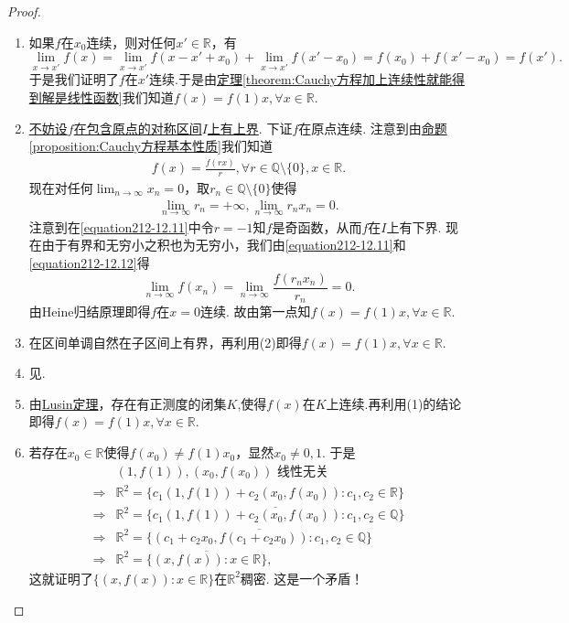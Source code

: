\documentclass[../../main.tex]{subfiles}%
\begin{document}
\begin{proof}
\begin{enumerate}[(1)]
\item 如果\(f\)在\(x_0\)连续，则对任何\(x'\in\mathbb{R}\)，有
\[
\lim_{x\rightarrow x'} f(x)=\lim_{x\rightarrow x'} f(x - x'+x_0)+\lim_{x\rightarrow x'} f(x' - x_0)=f(x_0)+f(x' - x_0)=f(x').
\]
于是我们证明了\(f\)在\(x'\)连续.于是由\hyperref[theorem:Cauchy方程加上连续性就能得到解是线性函数]{定理\ref{theorem:Cauchy方程加上连续性就能得到解是线性函数}}我们知道\(f(x)=f(1)x,\forall x\in\mathbb{R}\).

\item \hyperlink{不妨设的原因112}{不妨设\(f\)在包含原点的对称区间\(I\)上有上界}. 下证\(f\)在原点连续. 注意到由\hyperref[proposition:Cauchy方程基本性质]{命题\ref{proposition:Cauchy方程基本性质}}我们知道
\begin{align}
f(x)=\frac{f(rx)}{r},\forall r\in\mathbb{Q}\setminus\{0\},x\in\mathbb{R}.\label{equation212-12.11}
\end{align}
现在对任何\(\lim_{n\rightarrow\infty}x_n = 0\)，取\(r_n\in\mathbb{Q}\setminus\{0\}\)使得
\begin{align}
\lim_{n\rightarrow\infty}r_n=+\infty,\lim_{n\rightarrow\infty}r_nx_n = 0.\label{equation212-12.12} 
\end{align}
注意到在\eqref{equation212-12.11}中令\(r = -1\)知\(f\)是奇函数，从而\(f\)在\(I\)上有下界. 现在由于有界和无穷小之积也为无穷小，我们由\eqref{equation212-12.11}和\eqref{equation212-12.12}得
\[
\lim_{n\rightarrow\infty} f(x_n)=\lim_{n\rightarrow\infty}\frac{f(r_nx_n)}{r_n}=0.
\]
由Heine归结原理即得\(f\)在\(x = 0\)连续. 故由第一点知\(f(x)=f(1)x,\forall x\in\mathbb{R}\).

\item 在区间单调自然在子区间上有界，再利用(2)即得\(f(x)=f(1)x,\forall x\in\mathbb{R}\).

\item 见.

\item 由\hyperref[Real-Analysis-theorem:Lusin(卢津)定理]{Lusin定理}，存在有正测度的闭集\(K\),使得\(f(x)\)在$K$上连续.再利用(1)的结论即得\(f(x)=f(1)x,\forall x\in\mathbb{R}\).

\item 若存在\(x_0\in\mathbb{R}\)使得\(f(x_0)\neq f(1)x_0\)，显然\(x_0\neq0,1\). 于是
\begin{align*}
&(1,f(1)),(x_0,f(x_0))\text{ 线性无关}\\
\Rightarrow&\mathbb{R}^2=\{c_1(1,f(1))+c_2(x_0,f(x_0)):c_1,c_2\in\mathbb{R}\}\\
\Rightarrow&\mathbb{R}^2=\overline{\{c_1(1,f(1))+c_2(x_0,f(x_0)):c_1,c_2\in\mathbb{Q}\}}\\
\Rightarrow&\mathbb{R}^2=\overline{\{(c_1 + c_2x_0,f(c_1 + c_2x_0)):c_1,c_2\in\mathbb{Q}\}}\\
\Rightarrow&\mathbb{R}^2=\overline{\{(x,f(x)):x\in\mathbb{R}\}},
\end{align*}
这就证明了\(\{(x,f(x)):x\in\mathbb{R}\}\)在\(\mathbb{R}^2\)稠密. 这是一个矛盾！
\end{enumerate}

\end{proof}
\end{document}
